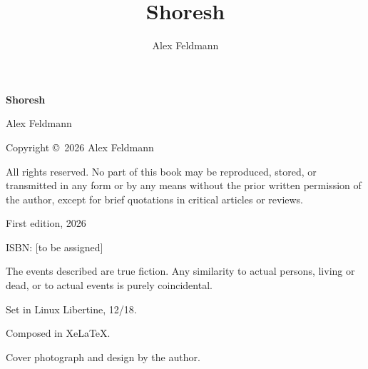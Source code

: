 \documentclass[12pt, twoside, openright]{book}
\title{Shoresh}
\author{Alex Feldmann}
\date{}
\begin{document}
	\frontmatter
	
	\thispagestyle{empty}
	\begin{center}
		\vspace*{1.5in}
		
		{\Huge\bfseries Shoresh}
		
		\vspace{1in}
		
		{\Large Alex Feldmann}
		
		\vspace{3in}
		
	\end{center}
	
	\clearpage
	
	\thispagestyle{empty}
	\vspace*{7in}
	
	\begin{center}
		\footnotesize
		
		Copyright \copyright\ 2026 Alex Feldmann
		
		All rights reserved. No part of this book may be reproduced, stored, or transmitted in any form or by any means without the prior written permission of the author, except for brief quotations in critical articles or reviews.

		\vspace{1em}

		First edition, 2026

		ISBN: [to be assigned]

		\vspace{1em}

		The events described are true fiction. Any similarity to actual persons, living or dead, or to actual events is purely coincidental.

		\vspace{1em}

		Set in Linux Libertine, 12/18.

		Composed in Xe\LaTeX.

		Cover photograph and design by the author.
				
	\end{center}
	
	\clearpage
	
	\tableofcontents
	
\clearpage
	
	\mainmatter
	
\end{document}
